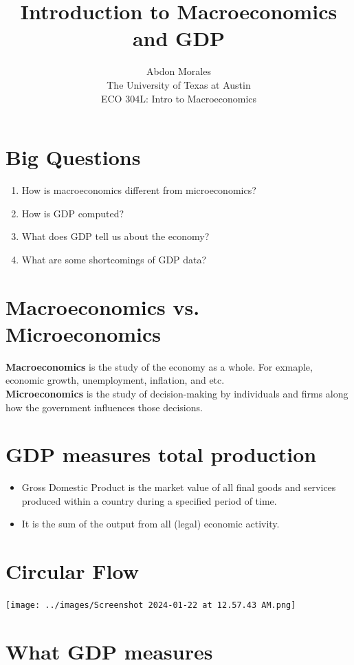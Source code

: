 \documentclass[12pt]{article} %
\title{Introduction to Macroeconomics and GDP}
\author{Abdon Morales \\ The University of Texas at Austin \\ ECO 304L: Intro to Macroeconomics}
\begin{document}
\maketitle

\section*{Big Questions}
\begin{center}
\begin{enumerate}
	\item How is macroeconomics different from microeconomics?
	\item How is GDP computed?
	\item What does GDP tell us about the economy?
	\item What are some shortcomings of GDP data?
\end{enumerate}
\end{center}

\section{Macroeconomics vs. Microeconomics}
\textbf{Macroeconomics} is the study of the economy as a whole. For exmaple, economic growth, unemployment, inflation, and etc.\\
\textbf{Microeconomics} is the study of decision-making by individuals and firms along how the government influences those decisions.

\section{GDP measures total production}
\begin{itemize}
	\item Gross Domestic Product is the market value of all final goods and services produced within a country during a specified period of time.
	\item It is the sum of the output from all (legal) economic activity.
\end{itemize}

\section{Circular Flow}

\texttt{[image: ../images/Screenshot 2024-01-22 at 12.57.43 AM.png]} 

\section{What GDP measures}
\end{document}

